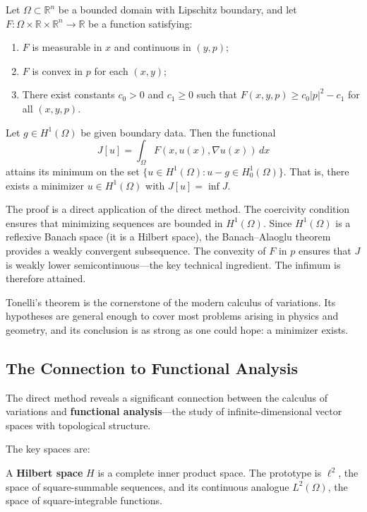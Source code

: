 \begin{theorem}
\label{thm:tonelli}
Let $\Omega \subset \mathbb{R}^n$ be a bounded domain with Lipschitz boundary, and let $F: \Omega \times \mathbb{R} \times \mathbb{R}^n \to \mathbb{R}$ be a function satisfying:
\begin{enumerate}
    \item $F$ is measurable in $x$ and continuous in $(y, p)$;
    \item $F$ is convex in $p$ for each $(x, y)$;
    \item There exist constants $c_0 > 0$ and $c_1 \geq 0$ such that $F(x, y, p) \geq c_0 |p|^2 - c_1$ for all $(x, y, p)$.
\end{enumerate}
Let $g \in H^1(\Omega)$ be given boundary data. Then the functional
\[
    J[u] = \int_\Omega F(x, u(x), \nabla u(x)) \, dx
\]
attains its minimum on the set $\{u \in H^1(\Omega) : u - g \in H^1_0(\Omega)\}$. That is, there exists a minimizer $u \in H^1(\Omega)$ with $J[u] = \inf J$.
\end{theorem}

The proof is a direct application of the direct method. The coercivity condition ensures that minimizing sequences are bounded in $H^1(\Omega)$. Since $H^1(\Omega)$ is a reflexive Banach space (it is a Hilbert space), the Banach--Alaoglu theorem provides a weakly convergent subsequence. The convexity of $F$ in $p$ ensures that $J$ is weakly lower semicontinuous---the key technical ingredient. The infimum is therefore attained.

Tonelli's theorem is the cornerstone of the modern calculus of variations. Its hypotheses are general enough to cover most problems arising in physics and geometry, and its conclusion is as strong as one could hope: a minimizer exists.

\subsection{The Connection to Functional Analysis}

The direct method reveals a significant connection between the calculus of variations and \textbf{functional analysis}---the study of infinite-dimensional vector spaces with topological structure.

The key spaces are:

\begin{definition}
A \textbf{Hilbert space} $H$ is a complete inner product space. The prototype is $\ell^2$, the space of square-summable sequences, and its continuous analogue $L^2(\Omega)$, the space of square-integrable functions.
\end{definition}


